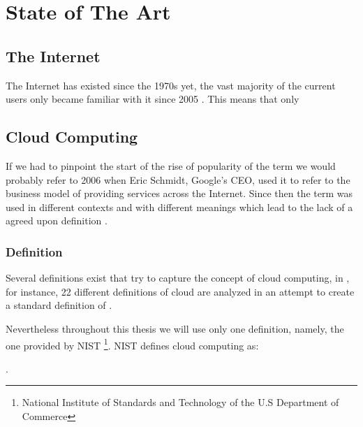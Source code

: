 \chapter{State of The Art} \label{chap:stateoftheart}
    \section{The Internet}

    The Internet has existed since the 1970s yet, the vast majority of the current users only became familiar with it since 2005 \cite{Guangming2011}. This means that only 


    \section{Cloud Computing} \label{chap:stateoftheart:sec:cloud}
    	If we had to pinpoint the start of the rise of popularity of the term  we would probably refer to 2006 when Eric Schmidt, Google's CEO, used it to refer to the business model of providing services across the Internet\cite{Zhang2010}.  Since then the term was used in different contexts and with different meanings which lead to the lack of a agreed upon definition \cite{Zhang2010}.
    
    
    	\subsection{Definition} \label{chap:stateoftheheart:sec:cloud:sec:definition}
        Several definitions exist that try to capture the concept of cloud computing, in  \cite{Vaquero2008}, for instance, 22 different definitions of cloud are analyzed in an attempt to create a standard definition of . 
        
        Nevertheless throughout this thesis we will use only one definition, namely, the one provided by NIST \footnote{National Institute of Standards and Technology of the U.S Department of Commerce}. NIST defines cloud computing as: 
        
        . 
        

